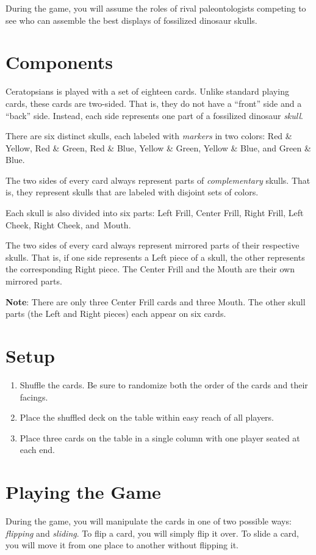 \documentclass[a6paper, parskip=half, DIV=14, 10pt]{scrartcl}
\begin{document}
During the game, you will assume the roles of rival paleontologists competing to see who can assemble the best displays of fossilized dinosaur skulls.


\section*{Components}
Ceratopsians is played with a set of eighteen cards. Unlike standard playing cards, these cards are two-sided. That is, they do not have a ``front'' side and a ``back'' side. Instead, each side represents one part of a fossilized dinosaur \emph{skull}.

There are six distinct skulls, each labeled with \emph{markers} in two colors: Red \& Yellow, Red \& Green, Red \& Blue, Yellow \& Green, Yellow \& Blue, and Green \& Blue.

The two sides of every card always represent parts of \emph{complementary} skulls. That is, they represent skulls that are labeled with disjoint sets of colors.

\newpage

Each skull is also divided into six parts: Left Frill, Center Frill, Right Frill, Left Cheek, Right Cheek, and~Mouth.

The two sides of every card always represent mirrored parts of their respective skulls.  That is, if one side represents a Left piece of a skull, the other represents the corresponding Right piece.  The Center Frill and the Mouth are their own mirrored parts. 

\textbf{Note}: There are only three Center Frill cards and three Mouth. The other skull parts (the Left and Right pieces) each appear on six cards.

\section*{Setup}
\begin{enumerate}[leftmargin=*]
	\item Shuffle the cards. Be sure to randomize both the order of the cards and their facings.
	\item Place the shuffled deck on the table within easy reach of all players.
	\item Place three cards on the table in a single column with one player seated at each end.
\end{enumerate}

\newpage

\section*{Playing the Game}
During the game, you will manipulate the cards in one of two possible ways: \emph{flipping} and \emph{sliding}. To flip a card, you will simply flip it over. To slide a card, you will move it from one place to another without flipping it.
\end{document}
